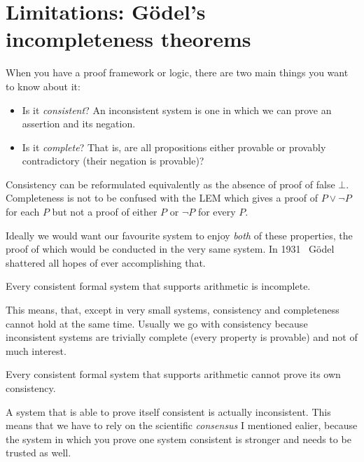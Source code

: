 \section{Limitations: Gödel's incompleteness theorems}

When you have a proof framework or logic, there are two main things you want to
know about it:
\begin{itemize}
  \item Is it \emph{consistent}? An inconsistent system is one in which we can
  prove an assertion and its negation.
  \item Is it \emph{complete}? That is, are all propositions either provable
  or provably contradictory (\ie their negation is provable)?
\end{itemize}

Consistency can be reformulated equivalently as the absence of proof of false
\(\bot\).
Completeness is not to be confused with the \acrshort{LEM} which gives a proof
of \(P \vee \neg P\) for each \(P\) but not a proof of either \(P\) or
\(\neg P\) for every \(P\).

Ideally we would want our favourite system to enjoy \emph{both} of these
properties, the proof of which would be conducted in the very same system.
In 1931~ Gödel shattered all hopes of ever
accomplishing that.

\begin{theorem}
  Every consistent formal system that supports arithmetic is incomplete.
\end{theorem}

This means, that, except in very small systems, consistency and completeness
cannot hold at the same time. Usually we go with consistency because
inconsistent systems are trivially complete (every property is provable) and not
of much interest.

\begin{theorem}
  Every consistent formal system that supports arithmetic cannot prove its
  own consistency.
\end{theorem}
A system that is able to prove itself consistent is actually inconsistent.
This means that we have to rely on the scientific \emph{consensus} I mentioned
ealier, because the system in which you prove one system consistent is stronger
and needs to be trusted as well.


